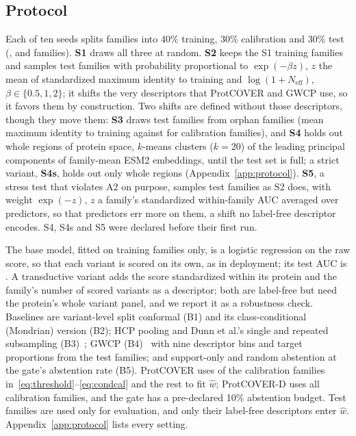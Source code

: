 \subsection{Protocol}\label{sec:protocol}
Each of ten seeds splits families into 40\% training, 30\% calibration and 30\% test (\nTrainFam{}, \nCalFam{} and \nTestFam{} families). \textbf{S1} draws all three at random. \textbf{S2} keeps the S1 training families and samples test families with probability proportional to $\exp(-\beta z)$, $z$ the mean of standardized maximum identity to training and $\log(1+N_{\mathrm{eff}})$, $\beta\in\{0.5,1,2\}$; it shifts the very descriptors that ProtCOVER and GWCP use, so it favors them by construction. Two shifts are defined without those descriptors, though they move them: \textbf{S3} draws test families from orphan families (mean maximum identity to training \sThreeTestMaxId{} against \sThreeCalMaxId{} for calibration families), and \textbf{S4} holds out whole regions of protein space, $k$-means clusters ($k=20$) of the leading principal components of family-mean ESM2 embeddings, until the test set is full; a strict variant, \textbf{S4s}, holds out only whole regions (Appendix~\ref{app:protocol}). \textbf{S5}, a stress test that violates A2 on purpose, samples test families as S2 does, with weight $\exp(-z)$, $z$ a family's standardized within-family AUC averaged over predictors, so that predictors err more on them, a shift no label-free descriptor encodes. S4, S4s and S5 were declared before their first run.

The base model, fitted on training families only, is a logistic regression on the raw score, so that each variant is scored on its own, as in deployment; its test AUC is \baseAucRange{}. A transductive variant adds the score standardized within its protein and the family's number of scored variants as a descriptor; both are label-free but need the protein's whole variant panel, and we report it as a robustness check. Baselines are variant-level split conformal (B1) and its class-conditional (Mondrian) version (B2); HCP pooling and Dunn et al.'s single and repeated subsampling (B3)~\cite{lee2026hierarchical,dunn2023distribution}; GWCP (B4)~\cite{bhattacharyya2024group} with nine descriptor bins and target proportions from the test families; and support-only and random abstention at the gate's abstention rate (B5). ProtCOVER uses \nCalConfFam{} of the calibration families in~\eqref{eq:threshold}--\eqref{eq:condcal} and the rest to fit $\hat w$; ProtCOVER-D uses all calibration families, and the gate has a pre-declared 10\% abstention budget. Test families are used only for evaluation, and only their label-free descriptors enter $\hat w$. Appendix~\ref{app:protocol} lists every setting.

